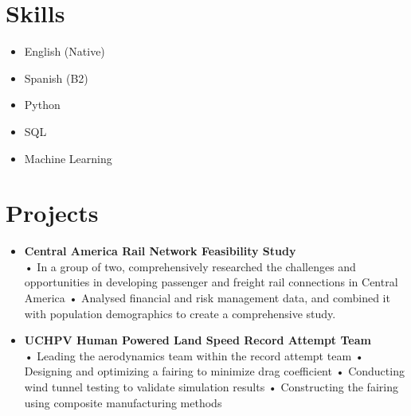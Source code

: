 \documentclass[a4paper,10pt]{article}
\begin{document}
\vspace{0.5cm}

\section*{Skills}
\begin{itemize}
    \item English (Native)
    \item Spanish (B2)
    \item Python
    \item SQL
    \item Machine Learning
\end{itemize}

\vspace{0.5cm}

\section*{Projects}
\begin{itemize}
    \item \textbf{Central America Rail Network Feasibility Study} \\
    •	In a group of two, comprehensively researched the challenges and opportunities in developing passenger and freight rail connections in Central America
    •	Analysed financial and risk management data, and combined it with population demographics to create a comprehensive study. 
    \item \textbf{UCHPV Human Powered Land Speed Record Attempt Team} \\
    •	Leading the aerodynamics team within the record attempt team
    •	Designing and optimizing a fairing to minimize drag coefficient
    •	Conducting wind tunnel testing to validate simulation results
    •	Constructing the fairing using composite manufacturing methods
    
\end{itemize}

\vspace{0.5cm}
\end{document}
